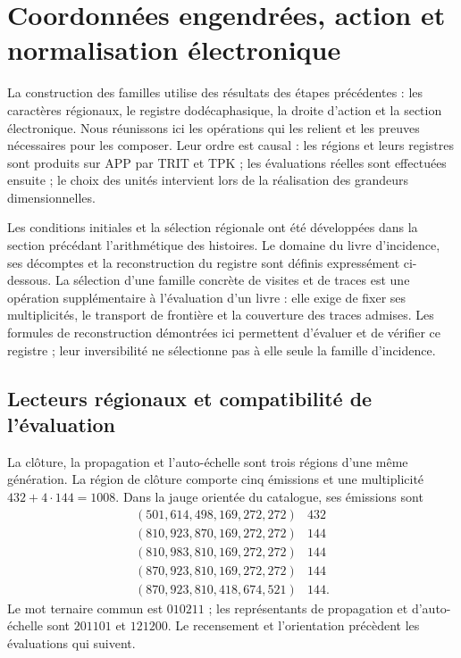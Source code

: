 \section{Coordonnées engendrées, action et normalisation électronique}
\label{vi:vi:dep:seccion}\label{vi:sec:k-registro}

La construction des familles utilise des résultats des étapes précédentes :
les caractères régionaux, le registre dodécaphasique, la droite d'action et la
section électronique. Nous réunissons ici les opérations qui les relient et les
preuves nécessaires pour les composer. Leur ordre est causal : les régions et leurs
registres sont produits sur APP par TRIT et TPK ; les évaluations réelles
sont effectuées ensuite ; le choix des unités intervient lors de la réalisation des
grandeurs dimensionnelles.

Les conditions initiales et la sélection régionale ont été développées dans
la section précédant l'arithmétique des histoires. Le domaine du livre
d'incidence, ses décomptes et la reconstruction du registre sont définis
expressément ci-dessous. La sélection d'une famille concrète de
visites et de traces est une opération supplémentaire à l'évaluation d'un livre :
elle exige de fixer ses multiplicités, le transport de frontière et la
couverture des traces admises. Les formules de reconstruction démontrées
ici permettent d'évaluer et de vérifier ce registre ; leur
inversibilité ne sélectionne pas à elle seule la famille d'incidence.

\subsection{Lecteurs régionaux et compatibilité de l’évaluation}
\label{vi:vi:dep:regiones}

La clôture, la propagation et l’auto-échelle sont trois régions d’une même
génération. La région de clôture comporte cinq émissions et une multiplicité
\(432+4\cdot144=1008\). Dans la jauge orientée du catalogue, ses émissions
sont
\[
\begin{array}{c|r}
(501,614,498,169,272,272)&432\\
(810,923,870,169,272,272)&144\\
(810,983,810,169,272,272)&144\\
(870,923,810,169,272,272)&144\\
(870,923,810,418,674,521)&144.
\end{array}
\]
Le mot ternaire commun est \(010211\) ; les représentants de propagation
et d’auto-échelle sont \(201101\) et \(121200\). Le recensement et l’orientation
précèdent les évaluations qui suivent.

